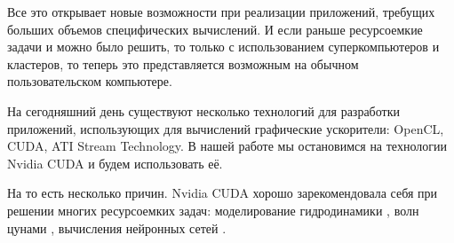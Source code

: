 Все это открывает новые возможности при реализации приложений, требущих больших объемов специфических вычислений. И если раньше ресурсоемкие задачи и можно было решить, то только с использованием суперкомпьютеров и кластеров, то теперь это представляется возможным на обычном пользовательском  компьютере. 

На сегодняшний день существуют несколько технологий для разработки приложений, использующих для вычислений графические ускорители: OpenCL, CUDA, ATI Stream Technology. В нашей работе мы остановимся на технологии Nvidia CUDA и будем использовать её. 

На то есть несколько причин. Nvidia CUDA хорошо зарекомендовала себя при решении многих ресурсоемких задач: моделирование гидродинамики \cite{berezin}, волн цунами \cite{cynami}, вычисления нейронных сетей \cite{neuron}.


